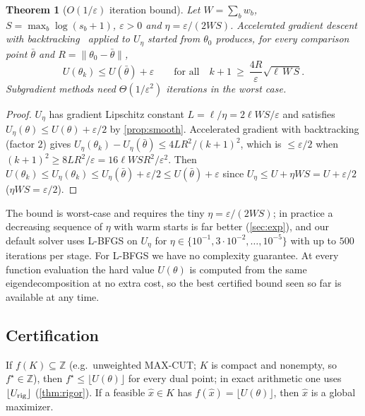 \documentclass[a4paper,11pt]{article}
\theoremstyle{plain}
\newtheorem{theorem}{Theorem}
\theoremstyle{definition}
\theoremstyle{remark}
\begin{document}
\begin{theorem}[$O(1/\varepsilon)$ iteration bound]\label{thm:rate}
Let $W=\sum_bw_b$, $S=\max_b\log(s_b+1)$, $\varepsilon>0$ and $\eta=\varepsilon/(2WS)$. Accelerated gradient descent with backtracking~\cite{beck2009} applied to $U_\eta$ started from $\theta_0$ produces, for every comparison point $\bar\theta$ and $R=\|\theta_0-\bar\theta\|$,
\[
U(\theta_k)\le U(\bar\theta)+\varepsilon\qquad\text{for all}\quad k+1\ \ge\ \frac{4R}{\varepsilon}\sqrt{\ell\,W\,S}.
\]
Subgradient methods need $\Theta(1/\varepsilon^2)$ iterations in the worst case.
\end{theorem}
\begin{proof}
$U_\eta$ has gradient Lipschitz constant $L=\ell/\eta=2\ell WS/\varepsilon$ and satisfies $U_\eta(\theta)\le U(\theta)+\varepsilon/2$ by \cref{prop:smooth}. Accelerated gradient with backtracking (factor $2$) gives $U_\eta(\theta_k)-U_\eta(\bar\theta)\le4LR^2/(k+1)^2$, which is $\le\varepsilon/2$ when $(k+1)^2\ge8LR^2/\varepsilon=16\ell WSR^2/\varepsilon^2$. Then $U(\theta_k)\le U_\eta(\theta_k)\le U_\eta(\bar\theta)+\varepsilon/2\le U(\bar\theta)+\varepsilon$ since $U_\eta\le U+\eta WS=U+\varepsilon/2$ ($\eta WS=\varepsilon/2$).
\end{proof}
\noindent The bound is worst-case and requires the tiny $\eta=\varepsilon/(2WS)$; in practice a decreasing sequence of $\eta$ with warm starts is far better (\cref{sec:exp}), and our default solver uses L-BFGS on $U_\eta$ for $\eta\in\{10^{-1},3\cdot10^{-2},\dots,10^{-5}\}$ with up to $500$ iterations per stage. For L-BFGS we have no complexity guarantee. At every function evaluation the hard value $U(\theta)$ is computed from the same eigendecomposition at no extra cost, so the best certified bound seen so far is available at any time.

\subsection{Certification}
\begin{corollary}\label{cor:integer}
If $f(K)\subseteq\mathbb Z$ (e.g.\ unweighted MAX-CUT; $K$ is compact and nonempty, so $f^\star\in\mathbb Z$), then $f^\star\le\lfloor U(\theta)\rfloor$ for every dual point; in exact arithmetic one uses $\lfloor U_{\rm rig}\rfloor$ (\cref{thm:rigor}). If a feasible $\hat x\in K$ has $f(\hat x)=\lfloor U(\theta)\rfloor$, then $\hat x$ is a global maximizer.
\end{corollary}
\end{document}
